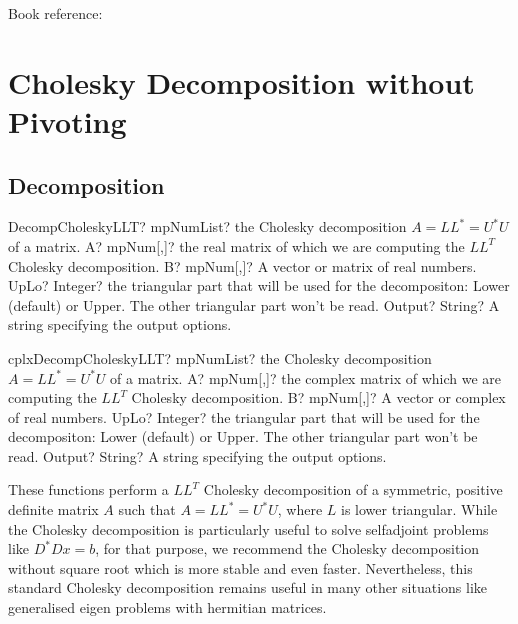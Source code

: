Book reference: \cite{Golub1996}





\section{Cholesky Decomposition without Pivoting}
\label{Cholesky Decomposition without Pivoting}

\subsection{Decomposition}

\begin{mpFunctionsExtract}
	\mpFunctionFour
	{DecompCholeskyLLT? mpNumList? the Cholesky decomposition $A = LL^* = U^*U$ of a matrix.}
	{A? mpNum[,]? the real matrix of which we are computing the $LL^T$ Cholesky decomposition.}
	{B? mpNum[,]? A vector or matrix of real numbers.}
	{UpLo? Integer? the triangular part that will be used for the decompositon: Lower (default) or Upper. The other triangular part won't be read.}
	{Output? String? A string specifying the output options.}
\end{mpFunctionsExtract}

\vspace{0.6cm}
\begin{mpFunctionsExtract}
	\mpFunctionFour
	{cplxDecompCholeskyLLT? mpNumList? the Cholesky decomposition $A = LL^* = U^*U$ of a matrix.}
	{A? mpNum[,]? the complex matrix of which we are computing the $LL^T$ Cholesky decomposition.}
	{B? mpNum[,]? A vector or complex of real numbers.}
	{UpLo? Integer? the triangular part that will be used for the decompositon: Lower (default) or Upper. The other triangular part won't be read.}
	{Output? String? A string specifying the output options.}
\end{mpFunctionsExtract}


\vspace{0.3cm}
These functions perform a $LL^T$ Cholesky decomposition of a symmetric, positive definite matrix $A$ such that $A = LL^* = U^*U$, where $L$ is lower triangular.
While the Cholesky decomposition is particularly useful to solve selfadjoint problems like $D^*D x = b$, for that purpose, we recommend the Cholesky decomposition without square root which is more stable and even faster. Nevertheless, this standard Cholesky decomposition remains useful in many other situations like generalised eigen problems with hermitian matrices.

